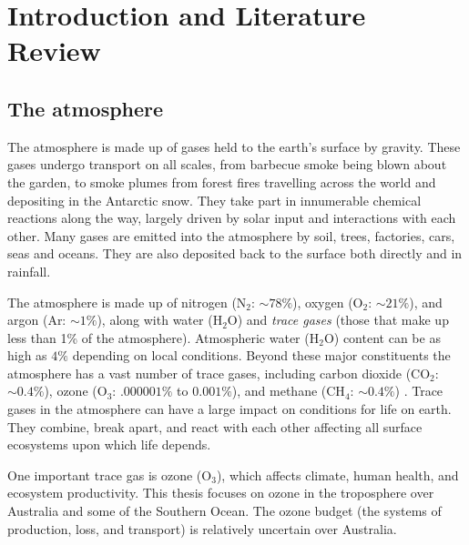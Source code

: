 \chapter{Introduction and Literature Review} %
\label{LR}

\section{The atmosphere}
\label{LR:Atmos}
  The atmosphere is made up of gases held to the earth's surface by gravity. 
  These gases undergo transport on all scales, from barbecue smoke being blown about the garden, to smoke plumes from forest fires travelling across the world and depositing in the Antarctic snow.
  They take part in innumerable chemical reactions along the way, largely driven by solar input and interactions with each other.
  Many gases are emitted into the atmosphere by soil, trees, factories, cars, seas and oceans.
  They are also deposited back to the surface both directly and in rainfall.
  
  The atmosphere is made up of nitrogen (N$_2$: $\sim 78\%$), oxygen (O$_2$: $\sim 21\%$), and argon (Ar: $\sim 1\%$), along with water (H$_2$O) and \textit{trace gases} (those that make up less than 1\% of the atmosphere).
  Atmospheric water (H$_2$O) content can be as high as $4\%$ depending on local conditions.
  Beyond these major constituents the atmosphere has a vast number of trace gases, including carbon dioxide (CO$_2$: $\sim 0.4\%$), ozone (O$_3$: $.000001\%$ to $0.001\%$), and methane (CH$_4$: $\sim 0.4\%$) \parencite[][Ch. 2]{BrasseurJacob2017}.
  Trace gases in the atmosphere can have a large impact on conditions for life on earth.
  They combine, break apart, and react with each other affecting all surface ecosystems upon which life depends.
  
  One important trace gas is ozone (O$_3$), which affects climate, human health, and ecosystem productivity.
  This thesis focuses on ozone in the troposphere over Australia and some of the Southern Ocean.
  The ozone budget (the systems of production, loss, and transport) is relatively uncertain over Australia.
  
